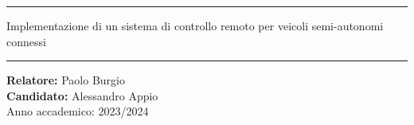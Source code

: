 \maketitle

\bigskip
\hrule
\bigskip

\begin{center}
  \noindent\huge{Implementazione di un sistema di controllo remoto per veicoli semi-autonomi connessi}
\end{center}

\bigskip
\hrule
\bigskip

\vfill
\begin{center}
  \large{\textbf{Relatore:} Paolo Burgio}\\
  \large{\textbf{Candidato:} Alessandro Appio}\\
  \bigskip
  \large{Anno accademico: 2023/2024}
\end{center}
